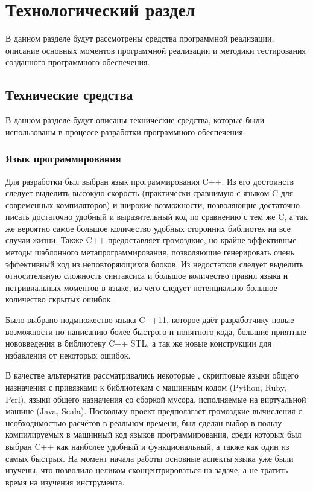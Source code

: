 \section{Технологический раздел}

В данном разделе будут рассмотрены 
средства программной 
реализации, описание основных моментов программной реализации и 
методики тестирования созданного программного обеспечения. 

\subsection{Технические средства}

В данном разделе будут описаны технические средства, которые
были использованы в процессе разработки программного обеспечения.

\subsubsection{Язык программирования}

Для разработки был выбран язык программирования C++. Из его достоинств следует
выделить высокую скорость (практически сравнимую с языком C для современных
компиляторов) и широкие возможности, позволяющие достаточно писать достаточно
удобный и выразительный код по сравнению с тем же C, а так же вероятно самое
большое количество удобных сторонних библиотек на все случаи жизни. Также C++
предоставляет громоздкие, но крайне эффективные методы шаблонного
метапрограммирования, позволяющие генерировать очень эффективный код из
неповторяющихся блоков. Из недостатков следует выделить относительную сложность синтаксиса и
большое количество правил языка и нетривиальных моментов в языке, из чего
следует потенциально большое количество скрытых ошибок.

Было выбрано подмножество языка C++11, которое даёт разработчику новые
возможности по написанию более быстрого и понятного кода, большие приятные
нововведения в библиотеку C++ STL, а так же новые конструкции для избавления от
некоторых ошибок.

В качестве альтернатив рассматривались некоторые , скриптовые языки общего назначения с
привязками к библиотекам с машинным кодом (Python, Ruby, Perl), языки общего
назначения со сборкой мусора, исполняемые на виртуальной машине (Java,
Scala). Поскольку проект предполагает громоздкие вычисления с необходимостью
расчётов в реальном времени, был сделан выбор в пользу компилируемых в машинный
код языков программирования, среди которых был выбран C++ как наиболее удобный и
функциональный, а также как один из самых быстрых.  На момент начала работы
основные аспекты языка уже были изучены, что позволило целиком
сконцентрироваться на задаче, а не тратить время на изучения инструмента.


